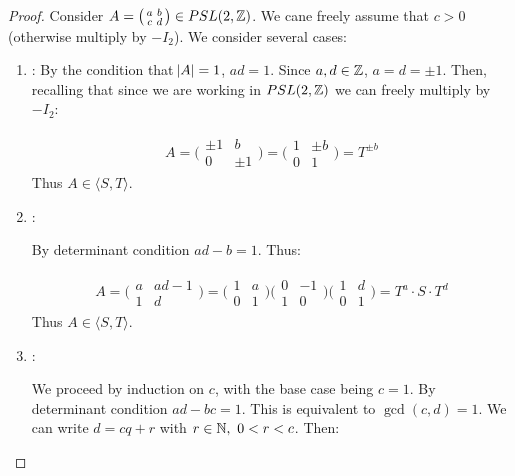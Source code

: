 \begin{proof}
Consider $A = \big(\begin{smallmatrix}
  a & b\\
  c & d
\end{smallmatrix}\big) \in PSL(2,\mathbb{Z})$. We cane freely assume that $c > 0$ (otherwise multiply by $- I_2$). We consider several cases:

\begin{enumerate}
    \item {}:
    By the condition that $\abs{A} = 1$, $ad = 1$. Since $a,d \in \mathbb{Z}$, $a = d = \pm 1$. Then, recalling that since we are working in $PSL(2,\mathbb{Z})$ we can freely multiply by $-I_2$:
    
    \begin{align*}
        A =  \bigg( \begin{matrix}
  \pm 1 & b\\
  0 & \pm 1
\end{matrix} \bigg) = \bigg( \begin{matrix}
  1 & \pm b\\
  0 & 1
\end{matrix} \bigg) = T^{\pm b}
    \end{align*}
    Thus $A \in \langle S,T \rangle$.
    
    \item {}:
    
    By determinant condition $ad-b = 1$. Thus:
    
    \begin{align*}
        A = \bigg( \begin{matrix}
  a & ad-1\\
  1 & d
\end{matrix} \bigg) = \bigg( \begin{matrix}
  1 & a\\
  0 & 1
\end{matrix} \bigg) \bigg( \begin{matrix}
  0 & -1\\
  1 & 0
\end{matrix} \bigg) \bigg( \begin{matrix}
  1 & d\\
  0 & 1
\end{matrix} \bigg) = T^a \cdot S \cdot T^d
    \end{align*}
Thus $A \in \langle S,T \rangle$.
    \item {}:
    
    We proceed by induction on $c$, with the base case being $c=1$. By determinant condition $ad-bc = 1$. This is equivalent to $\gcd(c,d) =1$. We can write $d = cq +r$ with $ r \in \mathbb{N}, \,\, 0 < r < c$. Then:
    

\end{enumerate}
\end{proof}
